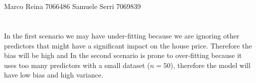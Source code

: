\documentclass[12pt]{article}
\begin{document}
\section*{}
Marco Reina 7066486 \newline
Samuele Serri 7069839 \newline
\section*{}
In the first scenario we may have under-fitting because we are ignoring other predictors that might have a significant impact on the house price. Therefore the bias will be high and 
In the second scenario is prone to over-fitting because it uses too many predictors with a small dataset ($n = 50$), therefore the model will have low bias and high variance. \newline
\end{document}
